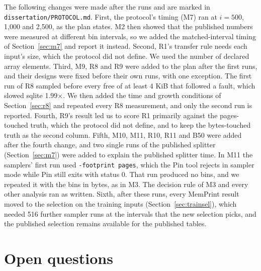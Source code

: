 \documentclass[11pt]{article}
\newcommand{\memprint}{MemPrint}
\begin{document}
The following changes were made after the runs and are marked in \texttt{dissertation/PROTOCOL.md}. First, the protocol's
timing (M7) ran at $i = 500$, 1,000 and 2,500, as the plan states. M2 then showed that the published numbers were
measured at different bin intervals, so we added the matched-interval timing of Section~\ref{sec:m7} and report it
instead. Second, R1's transfer rule needs each input's size, which the protocol did not define. We used the number
of declared array elements. Third, M9, R8 and R9 were added to the plan after the first runs, and their designs
were fixed before their own runs, with one exception. The first run of R8 sampled before every free of at least
4 KiB that followed a fault, which slowed sqlite 1.99$\times$. We then added the time and growth conditions of
Section~\ref{sec:r8} and repeated every R8 measurement, and only the second run is reported. Fourth, R9's result
led us to score R1 primarily against the pages-touched truth, which the protocol did not define, and to keep the
bytes-touched truth as the second column. Fifth, M10, M11, R10, R11 and B50 were added after the fourth change, and two single runs of the published splitter
(Section~\ref{sec:m7}) were added to explain the published splitter time. In M11
the samplers' first run used \texttt{-footprint pages}, which the Pin tool rejects in sampler mode while Pin still
exits with status 0. That run produced no bins, and we repeated it with the bins in bytes, as in M3. The decision rule of M3 and every other analysis ran as written. Sixth, after these runs, every \memprint{} result moved to the selection on the training
inputs (Section~\ref{sec:trainsel}), which needed 516 further sampler runs at the intervals that the new selection
picks, and the published selection remains available for the published tables.

\section{Open questions}
\label{sec:open}
\end{document}
